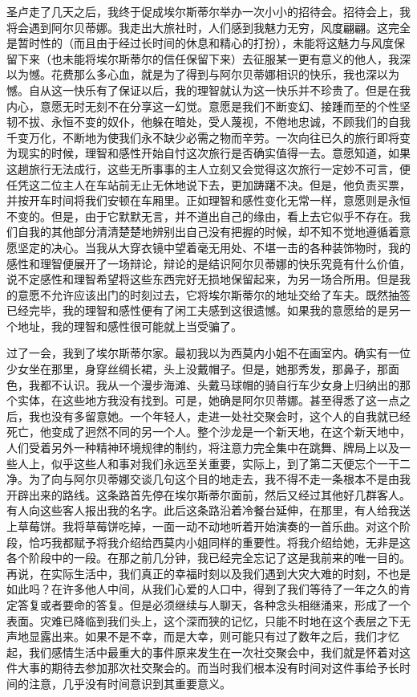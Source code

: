 \par 圣卢走了几天之后，我终于促成埃尔斯蒂尔举办一次小小的招待会。招待会上，我将会遇到阿尔贝蒂娜。我走出大旅社时，人们感到我魅力无穷，风度翩翩。这完全是暂时性的（而且由于经过长时间的休息和精心的打扮），未能将这魅力与风度保留下来（也未能将埃尔斯蒂尔的信任保留下来）去征服某一更有意义的他人，我深以为憾。花费那么多心血，就是为了得到与阿尔贝蒂娜相识的快乐，我也深以为憾。自从这一快乐有了保证以后，我的理智就认为这一快乐并不珍贵了。但是在我内心，意愿无时无刻不在分享这一幻觉。意愿是我们不断变幻、接踵而至的个性坚韧不拔、永恒不变的奴仆，他躲在暗处，受人蔑视，不倦地忠诚，不顾我们的自我千变万化，不断地为使我们永不缺少必需之物而辛劳。一次向往已久的旅行即将变为现实的时候，理智和感性开始自忖这次旅行是否确实值得一去。意愿知道，如果这趟旅行无法成行，这些无所事事的主人立刻又会觉得这次旅行一定妙不可言，便任凭这二位主人在车站前无止无休地说下去，更加踌躇不决。但是，他负责买票，并按开车时间将我们安顿在车厢里。正如理智和感性变化无常一样，意愿则是永恒不变的。但是，由于它默默无言，并不道出自己的缘由，看上去它似乎不存在。我们自我的其他部分清清楚楚地辨别出自己没有把握的时候，却不知不觉地遵循着意愿坚定的决心。当我从大穿衣镜中望着毫无用处、不堪一击的各种装饰物时，我的感性和理智便展开了一场辩论，辩论的是结识阿尔贝蒂娜的快乐究竟有什么价值，说不定感性和理智希望将这些东西完好无损地保留起来，为另一场合所用。但是我的意愿不允许应该出门的时刻过去，它将埃尔斯蒂尔的地址交给了车夫。既然抽签已经完毕，我的理智和感性便有了闲工夫感到这很遗憾。如果我的意愿给的是另一个地址，我的理智和感性很可能就上当受骗了。
\par 过了一会，我到了埃尔斯蒂尔家。最初我以为西莫内小姐不在画室内。确实有一位少女坐在那里，身穿丝绸长裙，头上没戴帽子。但是，她那秀发，那鼻子，那面色，我都不认识。我从一个漫步海滩、头戴马球帽的骑自行车少女身上归纳出的那个实体，在这些地方我没有找到。可是，她确是阿尔贝蒂娜。甚至得悉了这一点之后，我也没有多留意她。一个年轻人，走进一处社交聚会时，这个人的自我就已经死亡，他变成了迥然不同的另一个人。整个沙龙是一个新天地，在这个新天地中，人们受着另外一种精神环境规律的制约，将注意力完全集中在跳舞、牌局上以及一些人上，似乎这些人和事对我们永远至关重要，实际上，到了第二天便忘个一干二净。为了向与阿尔贝蒂娜交谈几句这个目的地走去，我不得不走一条根本不是由我开辟出来的路线。这条路首先停在埃尔斯蒂尔面前，然后又经过其他好几群客人。有人向这些客人报出我的名字。此后这条路沿着冷餐台延伸，在那里，有人给我送上草莓饼。我将草莓饼吃掉，一面一动不动地听着开始演奏的一首乐曲。对这个阶段，恰巧我都赋予将我介绍给西莫内小姐同样的重要性。将我介绍给她，无非是这各个阶段中的一段。在那之前几分钟，我已经完全忘记了这是我前来的唯一目的。再说，在实际生活中，我们真正的幸福时刻以及我们遇到大灾大难的时刻，不也是如此吗？在许多他人中间，从我们心爱的人口中，得到了我们等待了一年之久的肯定答复或者要命的答复。但是必须继续与人聊天，各种念头相继涌来，形成了一个表面。灾难已降临到我们头上，这个深而狭的记忆，只能不时地在这个表层之下无声地显露出来。如果不是不幸，而是大幸，则可能只有过了数年之后，我们才忆起，我们感情生活中最重大的事件原来发生在一次社交聚会中，我们就是怀着对这件大事的期待去参加那次社交聚会的。而当时我们根本没有时间对这件事给予长时间的注意，几乎没有时间意识到其重要意义。
